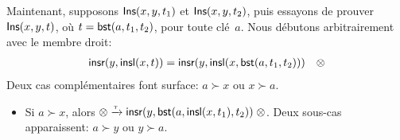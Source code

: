 Maintenant, supposons \(\textsf{Ins}({x,y,t_1})\) et
\(\textsf{Ins}({x,y,t_2})\), puis essayons de prouver
\(\textsf{Ins}({x,y,t})\), où \(t=\textsf{bst}(a,t_1,t_2)\), pour toute
clé~\(a\). Nous débutons arbitrairement avec le membre droit:
\begin{equation*}
\begin{array}{@{}r@{\;}l@{\;}l@{\quad}r@{}}
  \fun{insr}(y,\fun{insl}(x,t))
& = & \fun{insr}(y,\fun{insl}(x,\fun{bst}(a,t_1,t_2))) & \otimes
\end{array}
\end{equation*}
Deux cas complémentaires font surface: \(a \succ x\) ou \(x \succ a\).
\begin{itemize}

  \item Si \(a \succ x\), alors \(\otimes \xrightarrow{\smash{\tau}}
  \textsf{insr}(y,\textsf{bst}(a,\textsf{insl}(x,t_1),t_2)) \; \otimes\). Deux
  sous-cas apparaissent: \(a \succ y\) ou \(y \succ a\).
  \begin{itemize}


\end{itemize}
\end{itemize}
